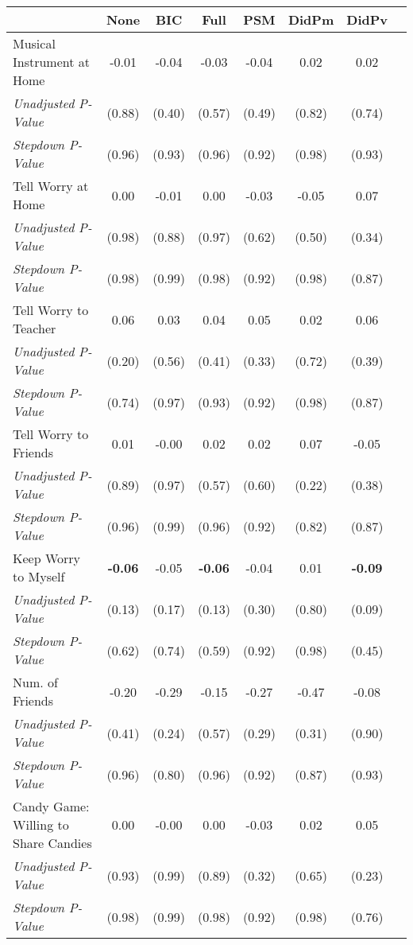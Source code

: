 \begin{tabular}{l c c c c c c c}
\toprule
 & None & BIC & Full & PSM & DidPm & DidPv \\
\midrule
Musical Instrument at Home & -0.01 & -0.04 & -0.03 & -0.04 & 0.02 & 0.02 \\
\quad \textit{Unadjusted P-Value} & (0.88) & (0.40) & (0.57) & (0.49) & (0.82) & (0.74) \\
\quad \textit{Stepdown P-Value} & (0.96) & (0.93) & (0.96) & (0.92) & (0.98) & (0.93) \\
Tell Worry at Home & 0.00 & -0.01 & 0.00 & -0.03 & -0.05 & 0.07 \\
\quad \textit{Unadjusted P-Value} & (0.98) & (0.88) & (0.97) & (0.62) & (0.50) & (0.34) \\
\quad \textit{Stepdown P-Value} & (0.98) & (0.99) & (0.98) & (0.92) & (0.98) & (0.87) \\
Tell Worry to Teacher & 0.06 & 0.03 & 0.04 & 0.05 & 0.02 & 0.06 \\
\quad \textit{Unadjusted P-Value} & (0.20) & (0.56) & (0.41) & (0.33) & (0.72) & (0.39) \\
\quad \textit{Stepdown P-Value} & (0.74) & (0.97) & (0.93) & (0.92) & (0.98) & (0.87) \\
Tell Worry to Friends & 0.01 & -0.00 & 0.02 & 0.02 & 0.07 & -0.05 \\
\quad \textit{Unadjusted P-Value} & (0.89) & (0.97) & (0.57) & (0.60) & (0.22) & (0.38) \\
\quad \textit{Stepdown P-Value} & (0.96) & (0.99) & (0.96) & (0.92) & (0.82) & (0.87) \\
Keep Worry to Myself & \textbf{ -0.06 } & -0.05 & \textbf{ -0.06 } & -0.04 & 0.01 & \textbf{ -0.09 } \\
\quad \textit{Unadjusted P-Value} & (0.13) & (0.17) & (0.13) & (0.30) & (0.80) & (0.09) \\
\quad \textit{Stepdown P-Value} & (0.62) & (0.74) & (0.59) & (0.92) & (0.98) & (0.45) \\
Num. of Friends & -0.20 & -0.29 & -0.15 & -0.27 & -0.47 & -0.08 \\
\quad \textit{Unadjusted P-Value} & (0.41) & (0.24) & (0.57) & (0.29) & (0.31) & (0.90) \\
\quad \textit{Stepdown P-Value} & (0.96) & (0.80) & (0.96) & (0.92) & (0.87) & (0.93) \\
Candy Game: Willing to Share Candies & 0.00 & -0.00 & 0.00 & -0.03 & 0.02 & 0.05 \\
\quad \textit{Unadjusted P-Value} & (0.93) & (0.99) & (0.89) & (0.32) & (0.65) & (0.23) \\
\quad \textit{Stepdown P-Value} & (0.98) & (0.99) & (0.98) & (0.92) & (0.98) & (0.76) \\
\bottomrule
\end{tabular}
